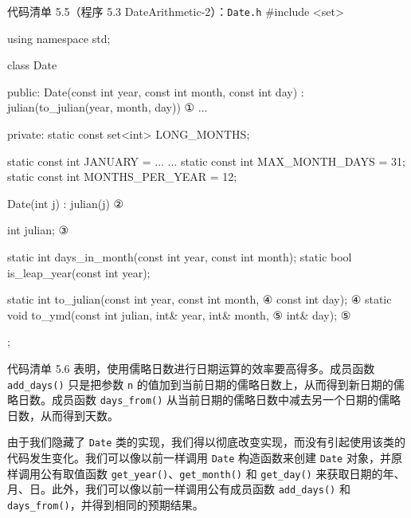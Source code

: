 \begin{codeboxt}{代码清单 5.5（程序 5.3 DateArithmetic-2）：\texttt{Date.h}}
#include <set>

using namespace std;

class Date
{
public:
    Date(const int year, const int month, const int day)
        : julian(to_julian(year, month, day)) {}               ①
    ...

private:
    static const set<int> LONG_MONTHS;

    static const int JANUARY  = ...
    ...
    static const int MAX_MONTH_DAYS  = 31;
    static const int MONTHS_PER_YEAR = 12;

    Date(int j) : julian(j) {}                                  ②

    int julian;                                                 ③

    static int days_in_month(const int year, const int month);
    static bool is_leap_year(const int year);

    static int to_julian(const int year, const int month,       ④
                         const int day);                        ④
    static void to_ymd(const int julian, int& year, int& month, ⑤
                                         int& day);             ⑤
};
\end{codeboxt}
\par
{}\par
{}\par
{}\par
{}\par

代码清单 5.6 表明，使用儒略日数进行日期运算的效率要高得多。成员函数 \texttt{add\_\allowbreak{}days(\allowbreak{})\allowbreak{}} 只是把参数 \texttt{n} 的值加到当前日期的儒略日数上，从而得到新日期的儒略日数。成员函数 \texttt{days\_\allowbreak{}from(\allowbreak{})\allowbreak{}} 从当前日期的儒略日数中减去另一个日期的儒略日数，从而得到天数。

由于我们隐藏了 \texttt{Date} 类的实现，我们得以彻底改变实现，而没有引起使用该类的代码发生变化。我们可以像以前一样调用 \texttt{Date} 构造函数来创建 \texttt{Date} 对象，并原样调用公有取值函数 \texttt{get\_\allowbreak{}year(\allowbreak{})\allowbreak{}}、\texttt{get\_\allowbreak{}month(\allowbreak{})\allowbreak{}} 和 \texttt{get\_\allowbreak{}day(\allowbreak{})\allowbreak{}} 来获取日期的年、月、日。此外，我们可以像以前一样调用公有成员函数 \texttt{add\_\allowbreak{}days(\allowbreak{})\allowbreak{}} 和 \texttt{days\_\allowbreak{}from(\allowbreak{})\allowbreak{}}，并得到相同的预期结果。

